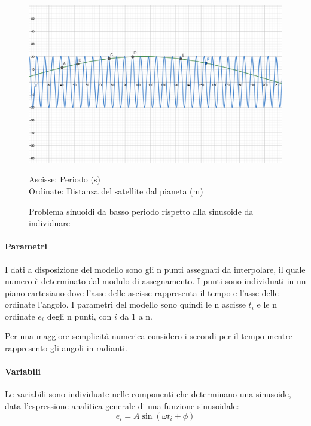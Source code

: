 \documentclass[a4paper,12pt]{report}
\begin{document}
\begin{figure}[H]
  \caption{Problema sinuoidi da basso periodo rispetto alla sinusoide da individuare}
  \begin{center}
  \includegraphics[scale=0.05]{img/bassoperiodo3.png}
  \end{center}
    Ascisse: Periodo (s) \\ Ordinate: Distanza del satellite dal pianeta (m)
  \label{fig:bassoperiodo3}
\end{figure}



\paragraph{Parametri}

I dati a disposizione del modello sono gli n punti assegnati da interpolare, il quale numero è determinato dal modulo di assegnamento. I punti sono individuati in un piano cartesiano dove l'asse delle ascisse rappresenta il tempo e l'asse delle ordinate l'angolo. I parametri del modello sono quindi le n ascisse $t_i$ e le n ordinate $e_i$ degli n punti, con $i$ da 1 a n.

Per una maggiore semplicità numerica considero i secondi per il tempo mentre rappresento gli angoli in radianti.


\paragraph{Variabili}
Le variabili sono individuate nelle componenti che determinano una sinusoide, data l'espressione analitica generale di una funzione sinusoidale:
\begin{equation}
e_i = A\sin(\omega t_i + \phi)
\end{equation}
\end{document}
